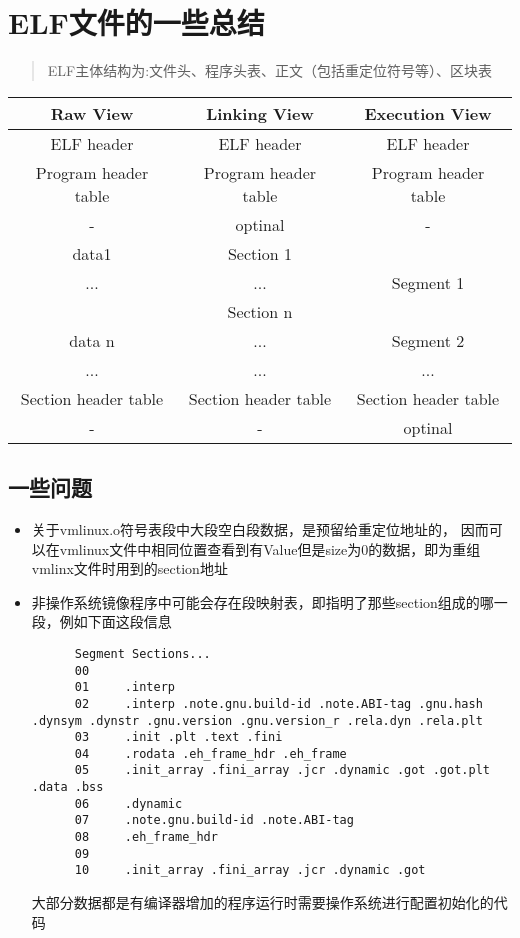 \section{ELF文件的一些总结}
  \begin{quote}
    ELF主体结构为:文件头、程序头表、正文（包括重定位符号等）、区块表\cite{Yale}
  \end{quote}
\begin{table}[h!]
  \centering
  \begin{tabular}{c|c|c}
    \hline
    Raw View & Linking View & Execution View \\
    \hline
    ELF header & ELF header & ELF header \\
    Program header table  &Program header table & Program header table \\
    - &optinal &  -\\
    data1  & Section 1 & \\
    ...  &...&Segment 1\\
     & Section n & \\
    data n  &...&Segment 2\\
    ...&...&...\\
    Section header table  &Section header table & Section header table \\
    -  &  - & optinal \\
    \hline
  \end{tabular}
\end{table}
\subsection{一些问题}
  \begin{itemize}
    \item 关于vmlinux.o符号表段中大段空白段数据，是预留给重定位地址的，
    因而可以在vmlinux文件中相同位置查看到有Value但是size为0的数据，即为重组vmlinx文件时用到的section地址
    \item 非操作系统镜像程序中可能会存在段映射表，即指明了那些section组成的哪一段，例如下面这段信息
    \begin{lstlisting}
      Segment Sections...
      00
      01     .interp
      02     .interp .note.gnu.build-id .note.ABI-tag .gnu.hash .dynsym .dynstr .gnu.version .gnu.version_r .rela.dyn .rela.plt
      03     .init .plt .text .fini
      04     .rodata .eh_frame_hdr .eh_frame
      05     .init_array .fini_array .jcr .dynamic .got .got.plt .data .bss
      06     .dynamic
      07     .note.gnu.build-id .note.ABI-tag
      08     .eh_frame_hdr
      09
      10     .init_array .fini_array .jcr .dynamic .got
    \end{lstlisting} 
    大部分数据都是有编译器增加的程序运行时需要操作系统进行配置初始化的代码
  \end{itemize}
  
